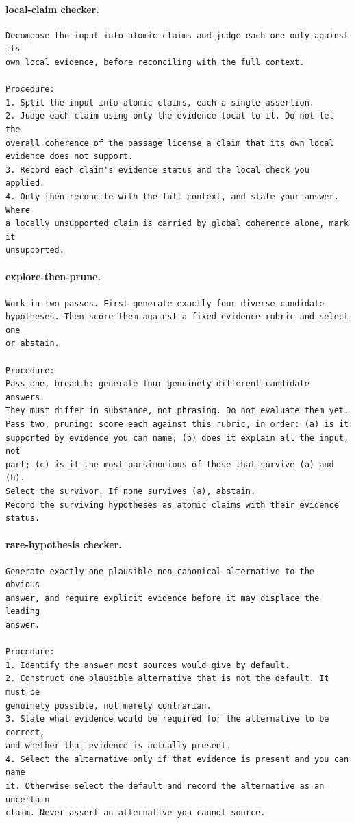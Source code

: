 \paragraph{local-claim checker.}
\begin{lstlisting}
Decompose the input into atomic claims and judge each one only against its
own local evidence, before reconciling with the full context.

Procedure:
1. Split the input into atomic claims, each a single assertion.
2. Judge each claim using only the evidence local to it. Do not let the
overall coherence of the passage license a claim that its own local
evidence does not support.
3. Record each claim's evidence status and the local check you applied.
4. Only then reconcile with the full context, and state your answer. Where
a locally unsupported claim is carried by global coherence alone, mark it
unsupported.
\end{lstlisting}

\paragraph{explore-then-prune.}
\begin{lstlisting}
Work in two passes. First generate exactly four diverse candidate
hypotheses. Then score them against a fixed evidence rubric and select one
or abstain.

Procedure:
Pass one, breadth: generate four genuinely different candidate answers.
They must differ in substance, not phrasing. Do not evaluate them yet.
Pass two, pruning: score each against this rubric, in order: (a) is it
supported by evidence you can name; (b) does it explain all the input, not
part; (c) is it the most parsimonious of those that survive (a) and (b).
Select the survivor. If none survives (a), abstain.
Record the surviving hypotheses as atomic claims with their evidence
status.
\end{lstlisting}

\paragraph{rare-hypothesis checker.}
\begin{lstlisting}
Generate exactly one plausible non-canonical alternative to the obvious
answer, and require explicit evidence before it may displace the leading
answer.

Procedure:
1. Identify the answer most sources would give by default.
2. Construct one plausible alternative that is not the default. It must be
genuinely possible, not merely contrarian.
3. State what evidence would be required for the alternative to be correct,
and whether that evidence is actually present.
4. Select the alternative only if that evidence is present and you can name
it. Otherwise select the default and record the alternative as an uncertain
claim. Never assert an alternative you cannot source.
\end{lstlisting}


